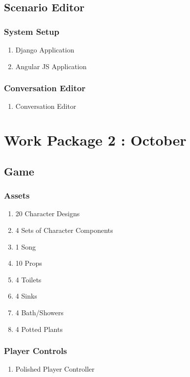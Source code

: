
\subsection{Scenario Editor}
\subsubsection{System Setup}
\begin{enumerate}
\item Django Application
\item Angular JS Application
\end{enumerate}
\subsubsection{Conversation Editor}
\begin{enumerate}
\item Conversation Editor
\end{enumerate}


\section{Work Package 2 : October}
\subsection{Game}
\subsubsection{Assets}
\begin{enumerate}
\item 20 Character Designs 
\item 4 Sets of Character Components
\item 1 Song
\item 10 Props
\item 4 Toilets
\item 4 Sinks
\item 4 Bath/Showers
\item 4 Potted Plants
\end{enumerate}
\subsubsection{Player Controls}
\begin{enumerate}
\item Polished Player Controller
\end{enumerate}
